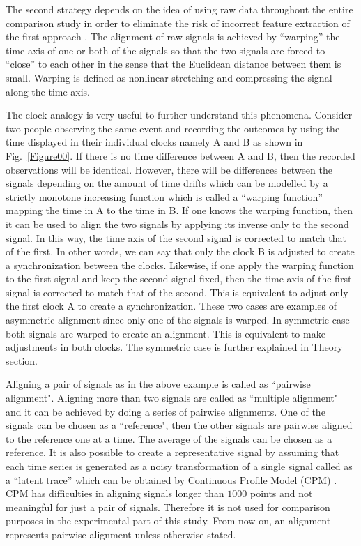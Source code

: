 \documentclass[number,1p,12pt]{elsarticle}
\begin{document}
The second strategy depends on the idea of using raw data throughout the entire comparison study in order to eliminate the risk of incorrect feature extraction of the first approach \cite{Crowe2005,Manaster2005,Mott1998}. The alignment of raw signals is achieved by ``warping'' the time axis of one or both of the signals so that the two signals are forced to ``close'' to each other in the sense that the Euclidean distance between them is small. Warping is defined as nonlinear stretching and compressing the signal along the time axis. 

The clock analogy is very useful to further understand this phenomena. Consider two people observing the same event and recording the outcomes by using the time displayed in their individual clocks namely A and B as shown in Fig.~\ref{Figure00}. If there is no time difference between A and B, then the recorded observations will be identical. However, there will be differences between the signals depending on the amount of time drifts which can be modelled by a strictly monotone increasing function which is called a ``warping function'' mapping the time in A to the time in B. If one knows the warping function, then it can be used to align the two signals by applying its inverse only to the second signal. In this way, the time axis of the second signal is corrected to match that of the first. In other words, we can say that only the clock B is adjusted to create a synchronization between the clocks. Likewise, if one apply the warping function to the first signal and keep the second signal fixed, then the time axis of the first signal is corrected to match that of the second. This is equivalent to adjust only the first clock A to create a synchronization. These  two cases are examples of asymmetric alignment since only one of the signals is warped. In symmetric case both signals are warped to create an alignment. This is equivalent to make adjustments in both clocks.  The symmetric case is further explained in Theory section.


Aligning a pair of signals as in the above example is called as ``pairwise alignment". Aligning more than two signals are called as ``multiple alignment" and it can be achieved by doing a series of pairwise alignments. One of the signals can be chosen as a ``reference", then the other signals are pairwise aligned to the reference one at a time. The average of the signals can be chosen as a reference. It is also possible to create a representative signal by assuming that each time series is generated as a noisy transformation of a single signal called as a ``latent trace'' which can be obtained by Continuous Profile Model (CPM)  \cite{Listgarten2005}. CPM has difficulties in aligning signals longer than $1000$ points and not meaningful for just a pair of signals.  Therefore it is not used for comparison purposes in the experimental part of this study. From now on, an alignment represents pairwise alignment unless otherwise stated.
\end{document}
